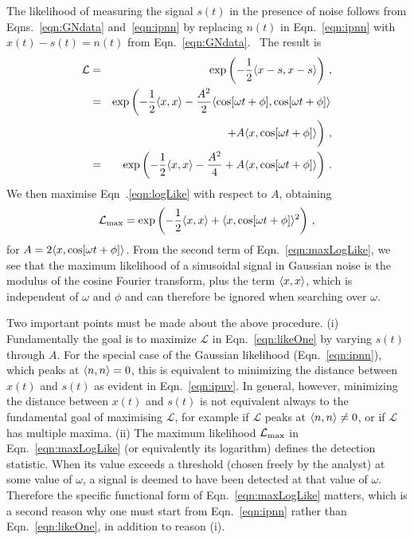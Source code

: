 \documentclass[paper-main.tex]{subfiles}
\begin{document}
The likelihood of measuring the signal $s(t)$ in the presence of noise follows from Eqns.~\ref{eqn:GNdata} and~\ref{eqn:ipnn} by replacing $n(t)$ in Eqn.~\ref{eqn:ipnn} with $x(t) - s(t) = n(t)$ from Eqn.~\ref{eqn:GNdata}.~\cite{JKS:1998,Jaynes:2003}
The result is
\begin{eqnarray}
\mathcal{L} &=& \exp\left( -\frac{1}{2}\langle x-s,x-s \rangle \right) \label{eqn:likeOne}\,, \\ 
            &=& \exp\left( -\frac{1}{2}\langle x,x \rangle - \frac{A^2}{2} \langle \cos[\omega t + \phi],\cos[\omega t + \phi] \rangle \right. \nonumber\\
                 &&\hspace{3em} \left. +  A \langle x,\cos[\omega t + \phi] \rangle \vphantom{\frac12}\right) \,,\\ 
                 &=& \exp \left( -\frac{1}{2}\langle x,x \rangle - \frac{A^2}{4} + A \langle x,\cos[\omega t + \phi] \rangle \right)\,.\label{eqn:logLike}
\end{eqnarray}
We then maximise Eqn~.\ref{eqn:logLike} with respect to $A$, obtaining 
\begin{eqnarray}
\label{eqn:maxLogLike}
\mathcal{L}_\mathrm{max} = \exp \left( - \frac{1}{2} \langle x,x \rangle + \langle x,\cos[\omega t + \phi] \rangle^2 \right)\,,
\end{eqnarray}
for $A = 2\langle x,\cos[\omega t + \phi] \rangle$.
From the second term of Eqn.~\ref{eqn:maxLogLike}, we see that the maximum likelihood of a sinusoidal signal in Gaussian noise is the modulus of the cosine Fourier transform, plus the term $\langle x,x \rangle$, which is independent of $\omega$ and $\phi$ and can therefore be ignored when searching over $\omega$.

Two important points must be made about the above procedure. 
(i) Fundamentally the goal is to maximize $\mathcal{L}$ in Eqn.~\ref{eqn:likeOne} by varying $s(t)$ through $A$.
For the special case of the Gaussian likelihood (Eqn.~\ref{eqn:ipnn}), which peaks at $\langle n,n \rangle= 0$, this is equivalent to minimizing the distance between $x(t)$ and $s(t)$ as evident in Eqn.~\ref{eqn:ipuv}.
In general, however, minimizing the distance between $x(t)$ and $s(t)$ is not equivalent always to the fundamental goal of maximising $\mathcal{L}$, for example if $\mathcal{L}$ peaks at $\langle n,n \rangle \neq 0$, or if $\mathcal{L}$ has multiple maxima.
(ii) The maximum likelihood $\mathcal{L}_{\rm max}$ in Eqn.~\ref{eqn:maxLogLike} (or equivalently its logarithm) defines the detection statistic. 
When its value exceeds a threshold (chosen freely by the analyst) at some value of $\omega$, a signal is deemed to have been detected at that value of $\omega$.
Therefore the specific functional form of Eqn.~\ref{eqn:maxLogLike} matters, which is a second reason why one must start from Eqn.~\ref{eqn:ipnn} rather than Eqn.~\ref{eqn:likeOne}, in addition to reason (i).
\end{document}
